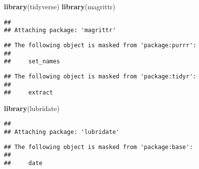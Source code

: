 \documentclass[]{article}
\newenvironment{Shaded}{\begin{snugshade}}{\end{snugshade}}
\newcommand{\KeywordTok}[1]{\textcolor[rgb]{0.13,0.29,0.53}{\textbf{#1}}}
\newcommand{\NormalTok}[1]{#1}
\begin{document}
\begin{Shaded}
\begin{Highlighting}[]
\KeywordTok{library}\NormalTok{(tidyverse)}
\KeywordTok{library}\NormalTok{(magrittr)}
\end{Highlighting}
\end{Shaded}

\begin{verbatim}
## 
## Attaching package: 'magrittr'
\end{verbatim}

\begin{verbatim}
## The following object is masked from 'package:purrr':
## 
##     set_names
\end{verbatim}

\begin{verbatim}
## The following object is masked from 'package:tidyr':
## 
##     extract
\end{verbatim}

\begin{Shaded}
\begin{Highlighting}[]
\KeywordTok{library}\NormalTok{(lubridate)}
\end{Highlighting}
\end{Shaded}

\begin{verbatim}
## 
## Attaching package: 'lubridate'
\end{verbatim}

\begin{verbatim}
## The following object is masked from 'package:base':
## 
##     date
\end{verbatim}
\end{document}
